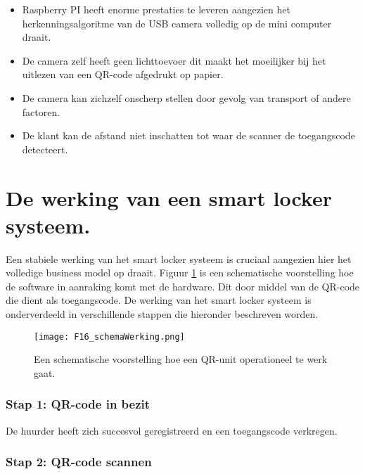 \begin{itemize}
    \item Raspberry PI heeft enorme prestaties te leveren aangezien het herkenningsalgoritme van de USB camera volledig op de mini computer draait.
    \item De camera zelf heeft geen lichttoevoer dit maakt het moeilijker bij het uitlezen van een QR-code afgedrukt op papier.
    \item De camera kan zichzelf onscherp stellen door gevolg van transport of andere factoren. 
    \item De klant kan de afstand niet inschatten tot waar de scanner de toegangscode detecteert.
\end{itemize}

\section{De werking van een smart locker systeem.}%
\label{sec:WerkingUnits}

Een stabiele werking van het smart locker systeem is cruciaal aangezien hier het volledige business model op draait. Figuur \ref{fig:schemaWerkingUnit} is een schematische voorstelling hoe de software in aanraking komt met de hardware. Dit door middel van de QR-code die dient als toegangscode. De werking van het smart locker systeem is onderverdeeld in verschillende stappen die hieronder beschreven worden.

\begin{figure}[h]
    \centering
    \texttt{[image: F16\_schemaWerking.png]}
    \captionsetup{justification=ce/brntering, singlelinecheck=false}    
    \caption{Een schematische voorstelling  hoe een QR-unit operationeel te werk gaat.}
    \label{fig:schemaWerkingUnit}
\end{figure}

\subsubsection{Stap 1: QR-code in bezit}

De huurder heeft zich succesvol geregistreerd en een toegangscode verkregen. 

\subsubsection{Stap 2: QR-code scannen}

